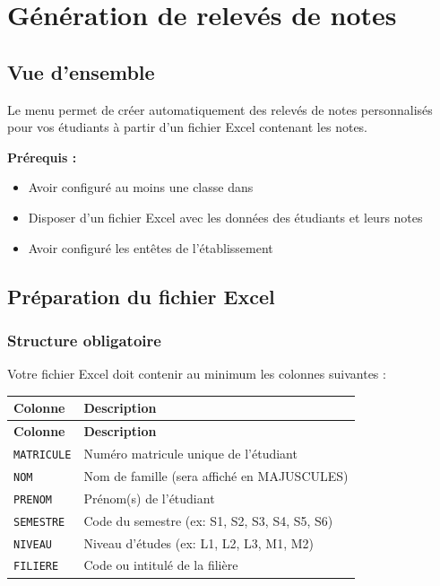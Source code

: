 \section{Génération de relevés de notes}

\subsection{Vue d'ensemble}

Le menu  permet de créer automatiquement des relevés de notes personnalisés pour vos étudiants à partir d'un fichier Excel contenant les notes.

\textbf{Prérequis :}
\begin{itemize}[leftmargin=*]
    \item Avoir configuré au moins une classe dans 
    \item Disposer d'un fichier Excel avec les données des étudiants et leurs notes
    \item Avoir configuré les entêtes de l'établissement
\end{itemize}

\subsection{Préparation du fichier Excel}

\subsubsection{Structure obligatoire}

Votre fichier Excel doit contenir au minimum les colonnes suivantes :

\begin{tcolorbox}[colback=blue!5!white,colframe=blue!75!black,title=Colonnes obligatoires]
\begin{longtable}{|l|p{10cm}|}
\hline
\textbf{Colonne} & \textbf{Description} \\
\hline
\endfirsthead
\hline
\textbf{Colonne} & \textbf{Description} \\
\hline
\endhead
\hline
\endfoot

\texttt{MATRICULE} & Numéro matricule unique de l'étudiant \\
\hline
\texttt{NOM} & Nom de famille (sera affiché en MAJUSCULES) \\
\hline
\texttt{PRENOM} & Prénom(s) de l'étudiant \\
\hline
\texttt{SEMESTRE} & Code du semestre (ex: S1, S2, S3, S4, S5, S6) \\
\hline
\texttt{NIVEAU} & Niveau d'études (ex: L1, L2, L3, M1, M2) \\
\hline
\texttt{FILIERE} & Code ou intitulé de la filière \\
\hline
\end{longtable}
\end{tcolorbox}

